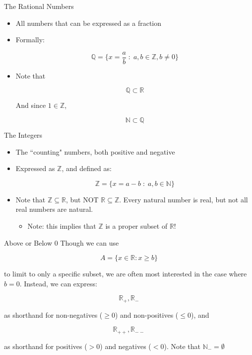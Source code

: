 \documentclass[10pt]{beamer}
\begin{document}
\begin{frame}{The Rational Numbers}
    \begin{itemize}
        \item All numbers that can be expressed as a fraction

        \item Formally:

        \[\mathbb{Q} = \{ x = \frac{a}{b} \; : \; a,b\in \mathbb{Z} , b \neq 0\}\]
\pause
        \item Note that 

        \[\mathbb{Q} \subset \mathbb{R}\]

        And since $1 \in \mathbb{Z}$,

        \[\mathbb{N} \subset \mathbb{Q}\]

        
    \end{itemize}
\end{frame}

\begin{frame}{The Integers}

\begin{itemize}
    \item The ``counting" numbers, both positive and negative

    \item Expressed as $\mathbb{Z}$, and defined as:

    \[\mathbb{Z} = \{x = a - b \;: \;a,b\in \mathbb{N} \}\]
\pause
    \item Note that $\mathbb{Z} \subseteq \mathbb{R}$, but NOT $\mathbb{R} \subseteq \mathbb{Z}$. Every natural number is real, but not all real numbers are natural.

    \begin{itemize}
        \item Note: this implies that $\mathbb{Z}$ is a proper subset of $\mathbb{R}$!
    \end{itemize}
\end{itemize}
\end{frame}

\begin{frame}{Above or Below $0$}
    Though we can use

    \[A = \{x \in \mathbb{R}:x \geq b \}\]

    to limit to only a specific subset, we are often most interested in the case where $b = 0$. Instead, we can express:

    \[\mathbb{R}_+, \mathbb{R}_-\]

    as shorthand for non-negatives ($\geq 0$) and non-positives ($\leq 0$), and

    \[\mathbb{R}_{++},\mathbb{R}_{--}\]

    as shorthand for positives ($>0$) and negatives ($<0$). Note that $\mathbb{N}_- = \emptyset$
\end{frame}
\end{document}
